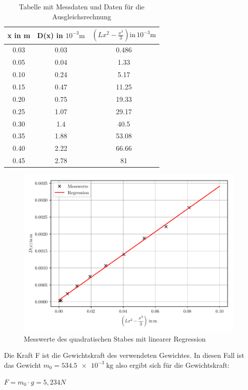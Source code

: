 \begin{table}
  \centering
  \caption{Tabelle mit Messdaten und Daten für die Ausgleichsrechnung}
  \begin{tabular}{c c c}
    \toprule
    x in \si{\meter} & D(x) in $10^{-3}\si{\meter}$ & $\left(Lx^2-\frac{x^3}{3}\right) \text{in} \, 10^{-3}\si{\meter}$ \\
    \midrule
    0.03 & 0.03 &  0.486 \\
    0.05 & 0.04 &  1.33 \\
    0.10 & 0.24 &  5.17 \\
    0.15 & 0.47 &  11.25 \\
    0.20 & 0.75 &  19.33 \\
    0.25 & 1.07 &  29.17 \\
    0.30 & 1.4 &  40.5 \\
    0.35 & 1.88 &  53.08 \\
    0.40 & 2.22 &  66.66 \\
    0.45 & 2.78 &  81 \\
    \bottomrule
  \end{tabular}
\end{table}

\begin{figure}[H]
  \centering
  \includegraphics[width=\textwidth]{ausgleichsgerade1.pdf}
  \caption{Messwerte des quadratischen Stabes mit linearer Regression}
\end{figure}

Die Kraft F ist die Gewichtskraft des verwendeten Gewichtes. In diesen Fall ist das Gewicht
$m_0 = \SI{534.5e-3}{\kilo\gram}$ also ergibt sich für die Gewichtskraft:\\
\centerline{$F = m_0 \cdot g = 5,234 N$}

